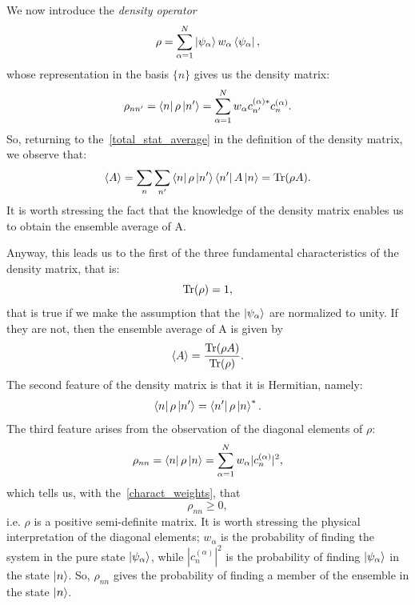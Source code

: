 We now introduce the \emph{density operator}
\begin{equation}
    \rho = \sum_{\alpha = 1}^N \ket{\psi_\alpha} w_\alpha \bra{\psi_\alpha},
\end{equation}
whose representation in the basis $\{n\}$ gives us the density matrix:
\begin{equation}
    \rho_{nn'} = \bra{n}\rho\ket{n'} = \sum_{\alpha = 1}^N w_\alpha c_{n'}^{(\alpha)*} c_n^{(\alpha)}.
\end{equation}
So, returning to the~\ref{total_stat_average} in the definition of the density matrix, we observe that:
\begin{equation*}
    \braket{A} = \sum_n \sum_{n'} \bra{n}\rho\ket{n'}\bra{n'}A\ket{n} = \operatorname{Tr}({\rho A}).
\end{equation*}
It is worth stressing the fact that the knowledge of the density matrix enables us to obtain the ensemble average of A.

Anyway, this leads us to the first of the three fundamental characteristics of the density matrix, that is:
\begin{equation}
    \operatorname{Tr}(\rho) = 1,
\end{equation}
that is true if we make the assumption that the $\ket{\psi_\alpha}$ are normalized to unity. If they are not, then the ensemble average of A is given by
\begin{equation}
    \braket{A} = \frac{\operatorname{Tr}(\rho A)}{\operatorname{Tr}(\rho)}.
\end{equation}
The second feature of the density matrix is that it is Hermitian, namely:
\begin{equation}
    \bra{n}\rho\ket{n'} = \bra{n'}\rho\ket{n}^*.
\end{equation}
The third feature arises from the observation of the diagonal elements of $\rho$:
\begin{equation}
    \rho_{nn} = \bra{n}\rho\ket{n} = \sum_{\alpha = 1}^N w_\alpha |c_{n}^{(\alpha)}|^2,
\end{equation}
which tells us, with the~\ref{charact_weights}, that
\begin{equation}
    \rho_{nn} \geq 0,
\end{equation}
i.e. $\rho$ is a positive semi-definite matrix.
It is worth stressing the physical interpretation of the diagonal elements; $w_\alpha$ is the probability of finding the system in the pure state $\ket{\psi_\alpha}$, while $|c_{n}^{(\alpha)}|^2$ is the probability of finding $\ket{\psi_\alpha}$ in the state $\ket{n}$. So, $\rho_{nn}$ gives the probability of finding a member of the ensemble in the state $\ket{n}$.

